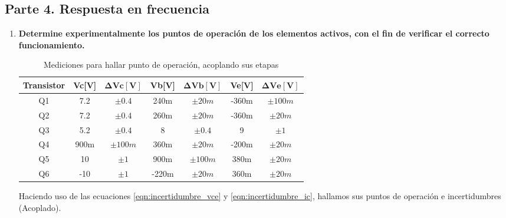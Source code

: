 \subsection{Parte 4. Respuesta en frecuencia}\label{subsec:parte4}

\begin{enumerate}
  \item \textbf{Determine experimentalmente los puntos de operación de los elementos activos, con el fin de verificar el correcto funcionamiento.}

        \begin{table}[H]
          \centering
          \begin{tabular}{|c|c|c|c|c|c|c|}
            \hline
            \textbf{Transistor} & \textbf{Vc[V]} & $\mathbf{\Delta Vc[V]}$ & \textbf{Vb[V]} & $\mathbf{\Delta Vb[V]}$ & \textbf{Ve[V]} & $\mathbf{\Delta Ve[V]}$ \\ \hline
            Q1                  & 7.2            & $\pm 0.4$               & 240m           & $\pm 20m$               & -360m          & $\pm 100m$              \\ \hline
            Q2                  & 7.2            & $\pm 0.4$               & 260m           & $\pm 20m$               & -360m          & $\pm 20m$               \\ \hline
            Q3                  & 5.2            & $\pm 0.4$               & 8              & $\pm 0.4$               & 9              & $\pm 1$                 \\ \hline
            Q4                  & 900m           & $\pm 100m$              & 360m           & $\pm 20m$               & -200m          & $\pm 20m$               \\ \hline
            Q5                  & 10             & $\pm 1$                 & 900m           & $\pm 100m$              & 380m           & $\pm 20m$               \\ \hline
            Q6                  & -10            & $\pm 1$                 & -220m          & $\pm 20m$               & 360m           & $\pm 20m$               \\ \hline
          \end{tabular}
          \caption{Mediciones para hallar punto de operación, acoplando sus etapas}
          \label{tab:punto_operacion4_aco}
        \end{table}



        Haciendo uso de las ecuaciones \ref{eqn:incertidumbre_vce} y \ref{eqn:incertidumbre_ic}, hallamos sus puntos de operación e incertidumbres (Acoplado).


\end{enumerate}
